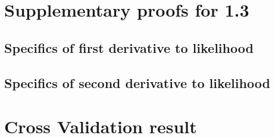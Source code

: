 \documentclass[11pt,a4paper]{article}
\begin{document}
\section{Supplementary proofs for 1.3}
\hypertarget{Derivation}{}
\subsection{Specifics of first derivative to likelihood} 
\hypertarget{DerivationB}{}
\subsection{Specifics of second derivative to likelihood}
\newpage


\section{Cross Validation result}
\hypertarget{twoFoldResult}{}
\end{document}
